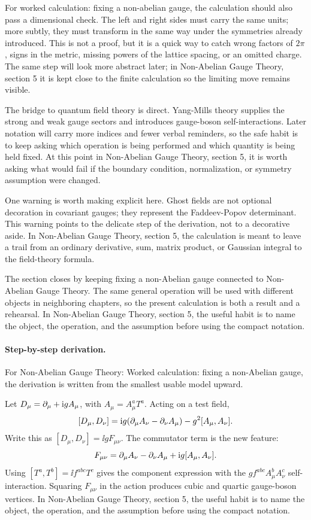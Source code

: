 For worked calculation: fixing a non-abelian gauge, the calculation should also pass a dimensional check.  The left and right sides must carry the same units; more subtly, they must transform in the same way under the symmetries already introduced.  This is not a proof, but it is a quick way to catch wrong factors of \(2\pi\), signs in the metric, missing powers of the lattice spacing, or an omitted charge.  The same step will look more abstract later; in Non-Abelian Gauge Theory, section 5 it is kept close to the finite calculation so the limiting move remains visible.

The bridge to quantum field theory is direct.  Yang-Mills theory supplies the strong and weak gauge sectors and introduces gauge-boson self-interactions.  Later notation will carry more indices and fewer verbal reminders, so the safe habit is to keep asking which operation is being performed and which quantity is being held fixed.  At this point in Non-Abelian Gauge Theory, section 5, it is worth asking what would fail if the boundary condition, normalization, or symmetry assumption were changed.

One warning is worth making explicit here.  Ghost fields are not optional decoration in covariant gauges; they represent the Faddeev-Popov determinant.  This warning points to the delicate step of the derivation, not to a decorative aside.  In Non-Abelian Gauge Theory, section 5, the calculation is meant to leave a trail from an ordinary derivative, sum, matrix product, or Gaussian integral to the field-theory formula.

The section closes by keeping fixing a non-Abelian gauge connected to Non-Abelian Gauge Theory.  The same general operation will be used with different objects in neighboring chapters, so the present calculation is both a result and a rehearsal.  In Non-Abelian Gauge Theory, section 5, the useful habit is to name the object, the operation, and the assumption before using the compact notation.



\paragraph{Step-by-step derivation.}

For Non-Abelian Gauge Theory: Worked calculation: fixing a non-Abelian gauge, the derivation is written from the smallest usable model upward.

Let \(D_\mu=\partial_\mu+\mathrm i gA_\mu\), with \(A_\mu=A_\mu^aT^a\).  Acting on a test field,
\[
  [D_\mu,D_\nu]
  =
  \mathrm i g(\partial_\mu A_\nu-\partial_\nu A_\mu)-g^2[A_\mu,A_\nu].
\]
Write this as \([D_\mu,D_\nu]=\ii gF_{\mu\nu}\).  The commutator term is the new feature:
\[
  F_{\mu\nu}=\partial_\mu A_\nu-\partial_\nu A_\mu+\mathrm i g[A_\mu,A_\nu].
\]
Using \([T^a,T^b]=\ii f^{abc}T^c\) gives the component expression with the \(gf^{abc}A_\mu^bA_\nu^c\) self-interaction.  Squaring \(F_{\mu\nu}\) in the action produces cubic and quartic gauge-boson vertices.  In Non-Abelian Gauge Theory, section 5, the useful habit is to name the object, the operation, and the assumption before using the compact notation.

